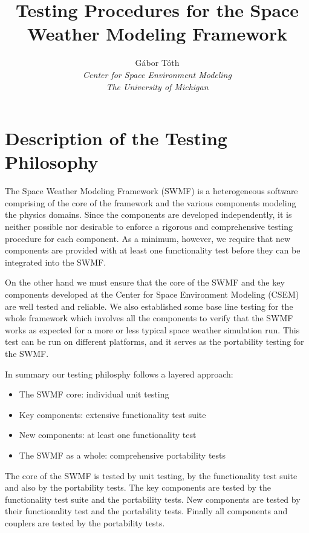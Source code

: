 \documentclass[twoside,10pt]{article}
\title{Testing Procedures for the Space Weather Modeling Framework}
\author{G\'abor T\'oth\\
  {\it Center for Space Environment Modeling}\\
  {\it The University of Michigan}}
\begin{document}
\pagestyle{fancy}
\lhead[\fancyplain{}{\bfseries\thepage}]{\fancyplain{}{\bfseries\rightmark}}
\rhead[\fancyplain{}{\bfseries\leftmark}]{\fancyplain{}{\bfseries\thepage}}
\cfoot{}

\maketitle

\newpage

\tableofcontents

\newpage

\section{Description of the Testing Philosophy}

The Space Weather Modeling Framework (SWMF) is a heterogeneous software
comprising of the core of the framework and the various components
modeling the physics domains. Since the components are developed 
independently, it is neither possible nor desirable to enforce a
rigorous and comprehensive testing procedure for each component.
As a minimum, however, we require that new components are provided
with at least one functionality test before they can be integrated
into the SWMF.

On the other hand we must ensure that the core of the SWMF and
the key components developed at the Center for Space Environment
Modeling (CSEM) are well tested and reliable. 
We also established some base line testing for the whole
framework which involves all the components to verify that the SWMF
works as expected for a more or less typical space weather simulation
run. This test can be run on different platforms, and it serves as
the portability testing for the SWMF.

In summary our testing philosphy follows a layered approach:
\begin{itemize}
\item The SWMF core: individual unit testing
\item Key components: extensive functionality test suite
\item New components: at least one functionality test
\item The SWMF as a whole: comprehensive portability tests
\end{itemize}
The core of the SWMF is tested by unit testing, by the functionality
test suite and also by the portability tests. The key components
are tested by the functionality test suite and the portability tests.
New components are tested by their functionality test and the 
portability tests. Finally all components and couplers are tested
by the portability tests.
\end{document}
